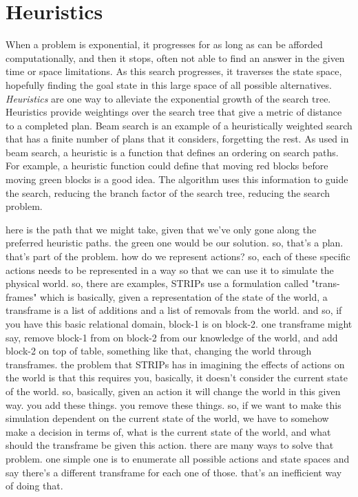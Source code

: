 \section{Heuristics}

When a problem is exponential, it progresses for as long as can be
afforded computationally, and then it stops, often not able to find an
answer in the given time or space limitations.  As this search
progresses, it traverses the state space, hopefully finding the goal
state in this large space of all possible alternatives.
\emph{Heuristics} are one way to alleviate the exponential growth of
the search tree.  Heuristics provide weightings over the search tree
that give a metric of distance to a completed plan.  Beam search is an
example of a heuristically weighted search that has a finite number of
plans that it considers, forgetting the rest.  As used in beam search,
a heuristic is a function that defines an ordering on search paths.
For example, a heuristic function could define that moving red blocks
before moving green blocks is a good idea.  The algorithm uses this
information to guide the search, reducing the branch factor of the
search tree, reducing the search problem.

here is the path that we might take, given that we've only gone along the preferred heuristic paths.
the green one would be our solution.
so, that's a plan.
that's part of the problem.
how do we represent actions?
so, each of these specific actions needs to be represented in a way so that we can use it to simulate the physical world.
so, there are examples, STRIPs use a formulation called "trans-frames" which is basically, given a representation of the state of the world, a transframe is a list of additions and a list of removals from the world.
and so, if you have this basic relational domain, block-1 is on block-2.
one transframe might say, remove block-1 from on block-2 from our knowledge of the world, and add block-2 on top of table, something like that, changing the world through transframes.
the problem that STRIPs has in imagining the effects of actions on the world is that this requires you, basically, it doesn't consider the current state of the world.
so, basically, given an action it will change the world in this given way.
you add these things.
you remove these things.
so, if we want to make this simulation dependent on the current state of the world, we have to somehow make a decision in terms of, what is the current state of the world, and what should the transframe be given this action.
there are many ways to solve that problem.
one simple one is to enumerate all possible actions and state spaces and say there's a different transframe for each one of those.
that's an inefficient way of doing that.

